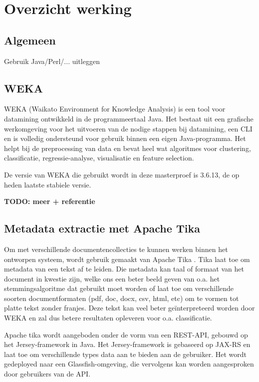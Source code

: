 \chapter{Overzicht werking}

\section{Algemeen}
Gebruik Java/Perl/... uitleggen

\section{WEKA}
WEKA (Waikato Environment for Knowledge Analysis) is een tool voor datamining ontwikkeld in de programmeertaal Java. Het bestaat uit een grafische werkomgeving  voor het uitvoeren van de nodige stappen bij datamining, een CLI en is volledig ondersteund voor gebruik binnen een eigen Java-programma. Het helpt bij de preprocessing van data en bevat heel wat algoritmes voor clustering, classificatie, regressie-analyse, visualisatie en feature selection.

De versie van WEKA die gebruikt wordt in deze masterproef is 3.6.13, de op heden laatste stabiele versie.

\textbf{TODO: meer + referentie}

\section{Metadata extractie met Apache Tika}
Om met verschillende documentencollecties te kunnen werken binnen het ontworpen systeem, wordt gebruik gemaakt van Apache Tika \cite{tika}. Tika laat toe om metadata van een tekst af te leiden. Die metadata kan taal of formaat van het document in kwestie zijn, welke ons een beter beeld geven van o.a. het stemmingsalgoritme dat gebruikt moet worden of laat toe om verschillende soorten documentformaten (pdf, doc, docx, csv, html, etc) om te vormen tot platte tekst zonder franjes. Deze tekst kan veel beter ge\"interpreteerd worden door WEKA en zal dus betere resultaten opleveren voor o.a. classificatie.

Apache tika wordt aangeboden onder de vorm van een REST-API, gebouwd op het Jersey-framework in Java. Het Jersey-framework is gebaseerd op JAX-RS en laat toe om verschillende types data aan te bieden aan de gebruiker. Het wordt gedeployed naar een Glassfish-omgeving, die vervolgens kan worden aangesproken door gebruikers van de API.

